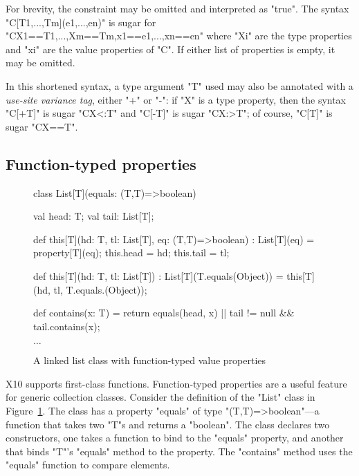 \documentclass[preprint,nocopyrightspace,9pt]{sigplanconf}
\begin{document}
For brevity, the constraint may be omitted and
interpreted as \xcd"true".
The syntax
\xcd"C[T1,...,Tm](e1,...,en)" is sugar for
\xcd"C{X1==T1,...,Xm==Tm,x1==e1,...,xn==en}"
where \xcd"Xi" are the type properties and \xcd"xi" are the
value properties of \xcd"C".
If either list of properties is empty, it may be omitted.

In this shortened syntax, a type argument \xcd"T" used may also be annotated
with
a \emph{use-site variance tag}, either \xcd"+" or \xcd"-":
if \xcd"X" is a type property, then
the syntax \xcd"C[+T]" is sugar \xcd"C{X<:T}" and
\xcd"C[-T]" is sugar \xcd"C{X:>T}"; of course,
\xcd"C[T]" is sugar \xcd"C{X==T}".

\subsection{Function-typed properties}

\begin{figure}

\begin{xtenmathnoindent}
class List[T](equals: (T,T)=>boolean) {
    val head: T;
    val tail: List[T];

    def this[T](hd: T, tl: List[T],
                eq: (T,T)=>boolean)
                : List[T](eq) = {
        property[T](eq);
        this.head = hd;
        this.tail = tl;
    }

    def this[T](hd: T, tl: List[T])
                : List[T](T.equals(Object)) = {
        this[T](hd, tl, T.equals.(Object));
    }

    def contains(x: T) = {
        return equals(head, x) ||
               tail != null && tail.contains(x);
    }

    $\dots$
}
\end{xtenmathnoindent}

\caption{A linked list class with function-typed value properties}
\label{fig:linked}
\end{figure}


X10 supports first-class functions.
Function-typed properties are a useful feature for generic
collection classes.  Consider the definition of the
\xcd"List" class in Figure~\ref{fig:linked}.
The class has a property \xcd"equals" of type
\xcd"(T,T)=>boolean"---a function that takes two \xcd"T"s and
returns a \xcd"boolean".  The class declares two constructors,
one takes a function to bind to the \xcd"equals"
property, and another that binds \xcd"T"'s \xcd"equals" method to
the property.  The \xcd"contains" method uses the \xcd"equals"
function to compare elements. 
\end{document}
